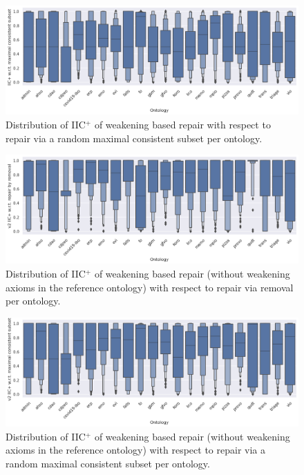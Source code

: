 \begin{figure}[htbp]
  \centering
  \includegraphics[width=\textwidth]{resources/eiic-mcs-ontology-violin.png}
  \caption{Distribution of IIC$^+$ of weakening based repair with respect to repair via a random maximal consistent subset per ontology.}
\end{figure}

\begin{figure}[htbp]
  \centering
  \includegraphics[width=\textwidth]{resources/eiic-enhance-rem-ontology-violin.png}
  \caption{Distribution of IIC$^+$ of weakening based repair (without weakening axioms in the reference ontology) with respect to repair via removal per ontology.}
\end{figure}

\begin{figure}[htbp]
  \centering
  \includegraphics[width=\textwidth]{resources/eiic-enhance-ontology-violin.png}
  \caption{Distribution of IIC$^+$ of weakening based repair (without weakening axioms in the reference ontology) with respect to repair via a random maximal consistent subset per ontology.}
\end{figure}

